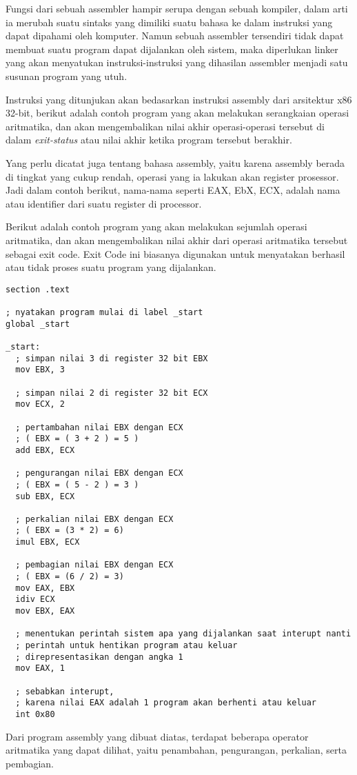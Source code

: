 Fungsi dari sebuah assembler hampir serupa dengan sebuah kompiler, dalam arti
ia merubah suatu sintaks yang dimiliki suatu bahasa ke dalam instruksi yang
dapat dipahami oleh komputer. Namun sebuah assembler tersendiri tidak dapat membuat suatu
program dapat dijalankan oleh sistem, maka diperlukan linker yang akan menyatukan
instruksi-instruksi yang dihasilan assembler menjadi satu susunan program yang utuh.

Instruksi yang ditunjukan akan bedasarkan instruksi assembly dari arsitektur x86 32-bit,
berikut adalah contoh program yang akan melakukan serangkaian operasi aritmatika,
dan akan mengembalikan nilai akhir operasi-operasi tersebut di dalam \textit{exit-status} atau
nilai akhir ketika program tersebut berakhir.

Yang perlu dicatat juga tentang bahasa assembly, yaitu karena assembly berada di tingkat
yang cukup rendah, operasi yang ia lakukan akan register prosessor. Jadi dalam contoh berikut,
nama-nama seperti EAX, EbX, ECX, adalah nama atau identifier dari suatu register di processor.

Berikut adalah contoh program yang akan melakukan sejumlah operasi aritmatika, dan akan mengembalikan
nilai akhir dari operasi aritmatika tersebut sebagai exit code. Exit Code ini biasanya digunakan
untuk menyatakan berhasil atau tidak proses suatu program yang dijalankan.

\begin{lstlisting}
section .text

; nyatakan program mulai di label _start
global _start

_start:
  ; simpan nilai 3 di register 32 bit EBX
  mov EBX, 3

  ; simpan nilai 2 di register 32 bit ECX
  mov ECX, 2

  ; pertambahan nilai EBX dengan ECX
  ; ( EBX = ( 3 + 2 ) = 5 )
  add EBX, ECX

  ; pengurangan nilai EBX dengan ECX
  ; ( EBX = ( 5 - 2 ) = 3 )
  sub EBX, ECX

  ; perkalian nilai EBX dengan ECX
  ; ( EBX = (3 * 2) = 6)
  imul EBX, ECX

  ; pembagian nilai EBX dengan ECX
  ; ( EBX = (6 / 2) = 3)
  mov EAX, EBX
  idiv ECX
  mov EBX, EAX

  ; menentukan perintah sistem apa yang dijalankan saat interupt nanti
  ; perintah untuk hentikan program atau keluar
  ; direpresentasikan dengan angka 1
  mov EAX, 1

  ; sebabkan interupt,
  ; karena nilai EAX adalah 1 program akan berhenti atau keluar
  int 0x80

\end{lstlisting}
Dari program assembly yang dibuat diatas, terdapat beberapa operator aritmatika
yang dapat dilihat, yaitu penambahan, pengurangan, perkalian, serta pembagian.

